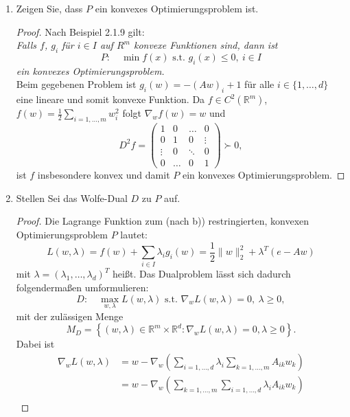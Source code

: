 \documentclass[12pt]{extreport} %
\newcommand{\R}{\mathbb{R}}
\theoremstyle{named}
\theoremstyle{nnamed}
\theoremstyle{itshape}
\theoremstyle{normal}
\begin{document}
\begin{enumerate}
\begin{proof}
			$$ f(x^\nu) = \frac{1}{2} \| x^\nu \|_2^2 \longrightarrow +\infty. $$
			Damit sind alle Voraussetzungen von Korollar 1.2.40 erfüllt, $S$ ist somit nicht-leer und kompakt und somit $P$ lösbar.
		\end{proof}
	\item Zeigen Sie, dass $P$ ein konvexes Optimierungsproblem ist.
		\begin{proof}
		Nach Beispiel 2.1.9 gilt: ~\\
			\textit{Falls $f$, $g_i$ für $i \in I$ auf $R^m$ konvexe Funktionen sind, dann ist}
			$$P: \quad \min f(x) \text{ s.t. } g_i (x) \leq 0, ~ i \in I $$
			\textit{ein konvexes Optimierungsproblem.} ~\\
			
			Beim gegebenen Problem ist $g_i(w) = - (A w)_i + 1$ für alle $i \in \{1, \dotsc, d \}$ eine lineare und somit konvexe Funktion. Da $f \in C^2(\R^m)$, $f(w) = \frac{1}{2} \sum_{i=1,\dotsc, m} w_i^2$ folgt $\nabla_w f(w) = w$ und 
			$$ D^2 f =  \left(\begin{array}{rrrrr} 1 & 0 & \dotsc & 0 \\ 0 & 1 & 0 & \vdots \\ \vdots & 0 & \ddots & 0\\ 0 &  \dotsc & 0 & 1 \end{array}\right) \succ 0, $$
			ist $f$ insbesondere konvex und damit $P$ ein konvexes Optimierungsproblem.
		\end{proof}
	\item Stellen Sei das Wolfe-Dual $D$ zu $P$ auf.
		\begin{proof}
			Die Lagrange Funktion zum (nach b)) restringierten, konvexen Optimierungsproblem $P$ lautet:
			$$ L(w, \lambda) = f(w) + \sum_{i \in I} \lambda_i g_i(w) = \frac{1}{2} \| w \|_2^2 + \lambda^T \left( e - Aw \right) $$
			mit $\lambda = \left( \lambda_1, \dotsc, \lambda_d \right)^T$ heißt. Das Dualproblem lässt sich dadurch folgendermaßen umformulieren:
			$$ D: \quad \max_{w,\lambda} L(w, \lambda) \text{ s.t. } \nabla_w L(w, \lambda) = 0, ~\lambda \geq 0, $$
			mit der zulässigen Menge
			$$ M_D = \left\{ (w, \lambda) \in \R^m \times \R^d \colon \nabla_w L(w, \lambda) = 0, \lambda \geq 0 \right\}. $$
			Dabei ist 
			\begin{align*}
			 \nabla_w L(w, \lambda) & = w - \nabla_w \left( \sum_{i=1,\dotsc,d} \lambda_i \sum_{k=1, \dotsc, m} A_{ik}w_{k} \right) \\
			& = w - \nabla_w \left( \sum_{k=1, \dotsc, m}  \sum_{i=1,\dotsc,d}  \lambda_i A_{ik}w_{k} \right) \\

\end{align*}
\end{proof}
\end{enumerate}
\end{document}
